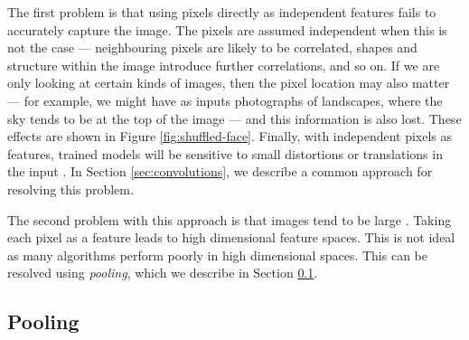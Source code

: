         The first problem is that using pixels directly as independent features
        fails to accurately capture the image. The pixels are assumed
        independent when this is not the case --- neighbouring pixels are likely
        to be correlated, shapes and structure within the image introduce
        further correlations, and so on. If we are only looking at certain kinds
        of images, then the pixel location may also matter --- for example, we
        might have as inputs photographs of landscapes, where the sky tends to
        be at the top of the image --- and this information is also lost. These
        effects are shown in Figure \ref{fig:shuffled-face}. Finally, with
        independent pixels as features, trained models will be sensitive to
        small distortions or translations in the input \citep{lecun98}. In
        Section \ref{sec:convolutions}, we describe a common approach for
        resolving this problem.

        The second problem with this approach is that images tend to be large
        \citep{lecun98}. Taking each pixel as a feature leads to high
        dimensional feature spaces. This is not ideal as many algorithms perform
        poorly in high dimensional spaces. This can be resolved using
        \emph{pooling}, which we describe in Section \ref{sec:pooling}.

    \subsection{Pooling}
    \label{sec:pooling}

